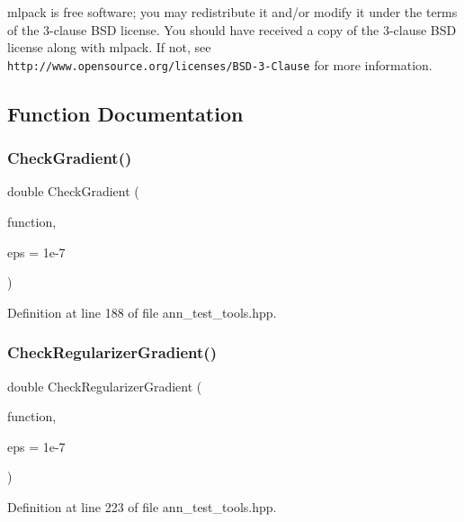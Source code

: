 mlpack is free software; you may redistribute it and/or modify it under the terms of the 3-\/clause B\+SD license. You should have received a copy of the 3-\/clause B\+SD license along with mlpack. If not, see {\tt http\+://www.\+opensource.\+org/licenses/\+B\+S\+D-\/3-\/\+Clause} for more information. 

\subsection{Function Documentation}
\mbox{\label{ann__test__tools_8hpp_ac9a7683ed87dc1de9e61256d5789890e}} 
\subsubsection{Check\+Gradient()}
{\footnotesize\ttfamily double Check\+Gradient (\begin{DoxyParamCaption}\item[{Function\+Type \&}]{function,  }\item[{const double}]{eps = {\ttfamily 1e-\/7} }\end{DoxyParamCaption})}



Definition at line 188 of file ann\+\_\+test\+\_\+tools.\+hpp.

\mbox{\label{ann__test__tools_8hpp_aa2e1d55cd23ecfcf17f1e450f04f8101}} 
\subsubsection{Check\+Regularizer\+Gradient()}
{\footnotesize\ttfamily double Check\+Regularizer\+Gradient (\begin{DoxyParamCaption}\item[{Function\+Type \&}]{function,  }\item[{const double}]{eps = {\ttfamily 1e-\/7} }\end{DoxyParamCaption})}



Definition at line 223 of file ann\+\_\+test\+\_\+tools.\+hpp.

